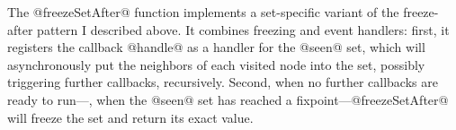 The @freezeSetAfter@ function implements a set-specific variant of the
freeze-after pattern I described above.  It combines freezing and
event handlers: first, it registers the callback @handle@ as a handler
for the @seen@ set, which will asynchronously put the neighbors of
each visited node into the set, possibly triggering further callbacks,
recursively.  Second, when no further callbacks are ready to
run---\ie, when the @seen@ set has reached a
fixpoint---@freezeSetAfter@ will freeze the set and return its exact
value.
